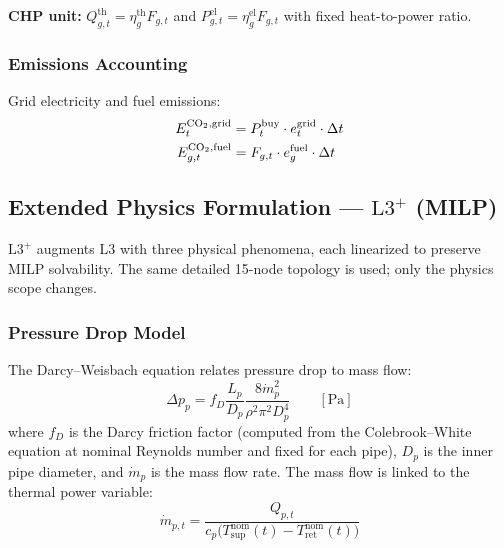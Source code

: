 \documentclass[review,3p]{elsarticle}
\newcommand{\Lplus}{\mathrm{L3}^{+}}
\begin{document}
\textbf{CHP unit:}
$Q_{g,t}^{\mathrm{th}} = \eta_g^{\mathrm{th}} F_{g,t}$ and
$P_{g,t}^{\mathrm{el}} = \eta_g^{\mathrm{el}} F_{g,t}$ with
fixed heat-to-power ratio.

\subsubsection{Emissions Accounting}

Grid electricity and fuel emissions:
\begin{align}
E_t^{\ce{CO2},\mathrm{grid}} &= P_t^{\mathrm{buy}}
\cdot e_t^{\mathrm{grid}} \cdot \Delta t
\label{eq:em_grid} \\
E_{g,t}^{\ce{CO2},\mathrm{fuel}} &= F_{g,t}
\cdot e_g^{\mathrm{fuel}} \cdot \Delta t
\label{eq:em_fuel}
\end{align}

\subsection{Extended Physics Formulation --- $\Lplus$ (MILP)}
\label{sec:milp_extended}

$\Lplus$ augments L3 with three physical phenomena, each linearized
to preserve MILP solvability. The same detailed 15-node topology is
used; only the physics scope changes.

\subsubsection{Pressure Drop Model}
\label{sec:model_pressure}

The Darcy--Weisbach equation relates pressure drop to mass flow:
\begin{equation}
\Delta p_{p} = f_D \frac{L_p}{D_p}
\frac{8 \dot{m}_p^2}{\rho^2 \pi^2 D_p^4}
\qquad [\mathrm{Pa}]
\label{eq:darcy}
\end{equation}
where $f_D$ is the Darcy friction factor (computed from the
Colebrook--White equation at nominal Reynolds number and fixed for
each pipe), $D_p$ is the inner pipe diameter, and $\dot{m}_p$ is
the mass flow rate. The mass flow is linked to the thermal power
variable:
\begin{equation}
\dot{m}_{p,t} = \frac{Q_{p,t}}{c_p \big(
T_{\mathrm{sup}}^{\mathrm{nom}}(t)
- T_{\mathrm{ret}}^{\mathrm{nom}}(t)\big)}
\label{eq:massflow}
\end{equation}
\end{document}
